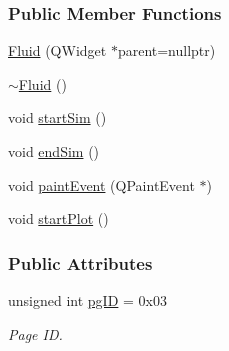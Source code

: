 \subsubsection*{Public Member Functions}
\begin{DoxyCompactItemize}
\item 
\mbox{\hyperlink{classFluid_af73b49dddf652b62f3cb78e400c09446}{Fluid}} (Q\+Widget $\ast$parent=nullptr)
\item 
\mbox{\hyperlink{classFluid_af461f45faf49d13c195739a57ab7814a}{$\sim$\+Fluid}} ()
\item 
void \mbox{\hyperlink{classFluid_af249a75d7ef113842c226b8b939c8f90}{start\+Sim}} ()
\item 
void \mbox{\hyperlink{classFluid_a92695db4868e8b2ec1bf4649ce5a9d19}{end\+Sim}} ()
\item 
void \mbox{\hyperlink{classFluid_a9f4b99a8c95a81cce3c0463607a997bb}{paint\+Event}} (Q\+Paint\+Event $\ast$)
\item 
void \mbox{\hyperlink{classFluid_ae7c7a362e1c6fcf2c88bfbf8f1836a52}{start\+Plot}} ()
\end{DoxyCompactItemize}
\subsubsection*{Public Attributes}
\begin{DoxyCompactItemize}
\item 
unsigned int \mbox{\hyperlink{classFluid_a6a918fd3756b078ac094010cf5215f90}{pg\+ID}} = 0x03
\begin{DoxyCompactList}\small\item\em Page ID. \end{DoxyCompactList}\end{DoxyCompactItemize}
